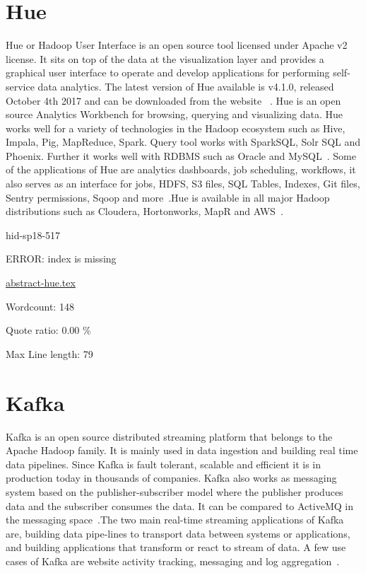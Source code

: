 \section{Hue}


Hue or Hadoop User Interface is an open source tool licensed under Apache v2
license. It sits on top of the data at the visualization layer and provides a
graphical user interface to operate and develop applications for performing
self-service data analytics.  The latest version of Hue available is v4.1.0,
released October 4th 2017 and can be downloaded from the website
~\cite{hid-sp18-517-hue-apache}. Hue is an open source Analytics Workbench for
browsing, querying and visualizing data. Hue works well for a variety of
technologies in the Hadoop ecosystem such as Hive, Impala, Pig, MapReduce,
Spark. Query tool works with SparkSQL, Solr SQL and Phoenix. Further it works
well with RDBMS such as Oracle and MySQL~\cite{hid-sp18-517-Hue-wiki}. Some of
the applications of Hue are analytics dashboards, job scheduling, workflows, it
also serves as an interface for jobs, HDFS, S3 files, SQL Tables, Indexes, Git
files, Sentry permissions, Sqoop and more~\cite{hid-sp18-517-Hue-wiki}.Hue is
available in all major Hadoop distributions such as Cloudera, Hortonworks, MapR
and AWS~\cite{hid-sp18-517-Hue-wiki}.


\begin{IU}

hid-sp18-517

ERROR: index is missing

\href{https://github.com/cloudmesh-community/hid-sp18-517/blob/master//technology/abstract-hue.tex}{abstract-hue.tex}

 

Wordcount: 148


Quote ratio: 0.00 \%
 
Max Line length: 79
\end{IU}

\section{Kafka}

Kafka is an open source distributed streaming platform that belongs 
to the Apache Hadoop family. It is mainly used in data ingestion and 
building real time data pipelines. Since Kafka is fault tolerant, 
scalable and efficient it is in production today in thousands of 
companies. Kafka also works as messaging system based on the 
publisher-subscriber model where the publisher produces data and 
the subscriber consumes the data. It can be compared to ActiveMQ 
in the messaging space~\cite{hid-sp18-517-ApacheKafka}.The two main
real-time streaming applications of Kafka are, building  data
pipe-lines to transport data between systems or applications, and
building applications that transform or react to stream of data. A few
use cases of Kafka are website activity tracking, messaging 
and log aggregation~\cite{hid-sp18-517-ApacheKafka}.



